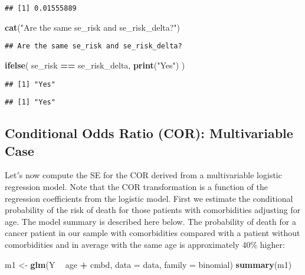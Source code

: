 \documentclass[
]{article}
\newenvironment{Shaded}{\begin{snugshade}}{\end{snugshade}}
\newcommand{\DataTypeTok}[1]{\textcolor[rgb]{0.13,0.29,0.53}{#1}}
\newcommand{\KeywordTok}[1]{\textcolor[rgb]{0.13,0.29,0.53}{\textbf{#1}}}
\newcommand{\NormalTok}[1]{#1}
\newcommand{\OperatorTok}[1]{\textcolor[rgb]{0.81,0.36,0.00}{\textbf{#1}}}
\newcommand{\StringTok}[1]{\textcolor[rgb]{0.31,0.60,0.02}{#1}}
\begin{document}
\begin{verbatim}
## [1] 0.01555889
\end{verbatim}

\begin{Shaded}
\begin{Highlighting}[]
\KeywordTok{cat}\NormalTok{(}\StringTok{"Are the same se_risk and se_risk_delta?"}\NormalTok{)}
\end{Highlighting}
\end{Shaded}

\begin{verbatim}
## Are the same se_risk and se_risk_delta?
\end{verbatim}

\begin{Shaded}
\begin{Highlighting}[]
\KeywordTok{ifelse}\NormalTok{(}
\NormalTok{  se_risk }\OperatorTok{==}\StringTok{ }\NormalTok{se_risk_delta,}
  \KeywordTok{print}\NormalTok{(}\StringTok{"Yes"}\NormalTok{)}
\NormalTok{)}
\end{Highlighting}
\end{Shaded}

\begin{verbatim}
## [1] "Yes"
\end{verbatim}

\begin{verbatim}
## [1] "Yes"
\end{verbatim}

\hypertarget{conditional-odds-ratio-cor-multivariable-case}{%
\subsection{Conditional Odds Ratio (COR): Multivariable
Case}\label{conditional-odds-ratio-cor-multivariable-case}}

Let\('\)s now compute the SE for the COR derived from a multivariable
logistic regression model. Note that the COR transformation is a
function of the regression coefficients from the logistic model. First
we estimate the conditional probability of the risk of death for those
patients with comorbidities adjusting for age. The model summary is
described here below. The probability of death for a cancer patient in
our sample with comorbidities compared with a patient without
comorbidities and in average with the same age is approximately 40\%
higher:

\begin{Shaded}
\begin{Highlighting}[]
\NormalTok{m1 <-}\StringTok{ }\KeywordTok{glm}\NormalTok{(Y }\OperatorTok{~}\StringTok{ }\NormalTok{age }\OperatorTok{+}\StringTok{ }\NormalTok{cmbd, }\DataTypeTok{data =}\NormalTok{ data, }\DataTypeTok{family =}\NormalTok{ binomial)}
\KeywordTok{summary}\NormalTok{(m1)}
\end{Highlighting}
\end{Shaded}
\end{document}
